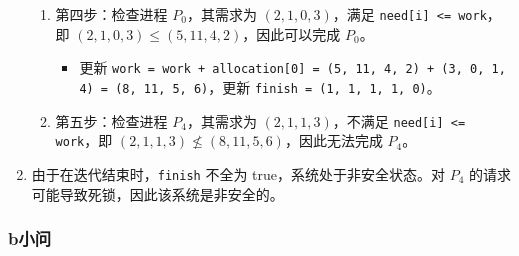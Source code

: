 \documentclass{article}
\begin{document}
\begin{enumerate}
\begin{enumerate}
		\item 第四步：检查进程 $P_0$，其需求为 $(2, 1, 0, 3)$，满足 \texttt{need[i] <= work}，即 $(2, 1, 0, 3) \leq (5, 11, 4, 2)$，因此可以完成 $P_0$。
		\begin{itemize}
			\item 更新 \texttt{work = work + allocation[0] = (5, 11, 4, 2) + (3, 0, 1, 4) = (8, 11, 5, 6)}，更新 \texttt{finish = (1, 1, 1, 1, 0)}。
		\end{itemize}
		
		\item 第五步：检查进程 $P_4$，其需求为 $(2, 1, 1, 3)$，不满足 \texttt{need[i] <= work}，即 $(2, 1, 1, 3) \nleq (8, 11, 5, 6)$，因此无法完成 $P_4$。
	\end{enumerate}
	
	\item 
	由于在迭代结束时，\texttt{finish} 不全为 true，系统处于非安全状态。对 $P_4$ 的请求可能导致死锁，因此该系统是非安全的。
\end{enumerate}

\subsubsection{b小问}
\end{document}
